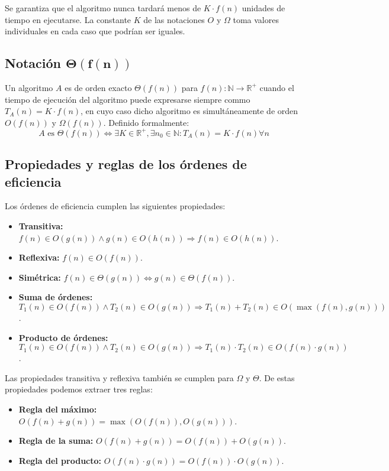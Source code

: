 Se garantiza que el algoritmo nunca tardará menos de $K\cdot f(n)$ unidades de tiempo en ejecutarse.
La constante $K$ de las notaciones $O$ y $\Omega$ toma valores individuales en cada caso que podrían ser iguales.

\subsection{Notación $\boldsymbol{\Theta(f(n))}$}

Un algoritmo $A$ es de orden exacto $\Theta(f(n))$ para $f(n):\mathbb{N}\rightarrow\mathbb{R}^+$ cuando el tiempo de ejecución del algoritmo puede expresarse siempre commo $T_A(n)=K\cdot f(n)$, en cuyo caso dicho algoritmo es simultáneamente de orden $O(f(n))$ y $\Omega(f(n))$.
Definido formalmente:
\[A\text{ es }\Theta(f(n))\Leftrightarrow\exists K\in\mathbb{R}^+,\exists n_0\in\mathbb{N}:T_A(n)=K\cdot f(n)\forall n\]

\subsection{Propiedades y reglas de los órdenes de eficiencia}

Los órdenes de eficiencia cumplen las siguientes propiedades:

\begin{itemize}
	\item\textbf{Transitiva:} $f(n)\in O(g(n))\land g(n)\in O(h(n))\Rightarrow f(n)\in O(h(n))$.
	\item\textbf{Reflexiva:} $f(n)\in O(f(n))$.
	\item\textbf{Simétrica:} $f(n)\in\Theta(g(n))\Leftrightarrow g(n)\in\Theta(f(n))$.
	\item\textbf{Suma de órdenes:} $T_1(n)\in O(f(n))\land T_2(n)\in O(g(n))\Rightarrow T_1(n)+T_2(n)\in O(\max(f(n),g(n)))$.
	\item\textbf{Producto de órdenes:} $T_1(n)\in O(f(n))\land T_2(n)\in O(g(n))\Rightarrow T_1(n)\cdot T_2(n)\in O(f(n)\cdot g(n))$.
\end{itemize}

Las propiedades transitiva y reflexiva también se cumplen para $\Omega$ y $\Theta$.
De estas propiedades podemos extraer tres reglas:

\begin{itemize}
		  \item\textbf{Regla del máximo:} $O(f(n)+g(n))=\max(O(f(n)),O(g(n)))$.
		  \item\textbf{Regla de la suma:} $O(f(n)+g(n))=O(f(n))+O(g(n))$.
		  \item\textbf{Regla del producto:} $O(f(n)\cdot g(n))=O(f(n))\cdot O(g(n))$.
\end{itemize}

